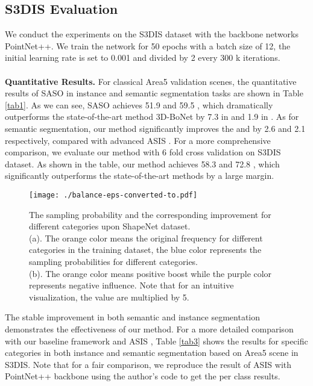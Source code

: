 \documentclass{cta-author}
\begin{document}
\subsection{S3DIS Evaluation}
We conduct the experiments on the S3DIS dataset with the backbone networks PointNet++. We train the network for 50 epochs with a batch size of 12, the initial learning rate is set to 0.001 and divided by 2 every 300 k iterations.\\ \hspace*{\fill} \\
\textbf{Quantitative Results.} For classical Area5 validation scenes, the quantitative results of SASO in instance and semantic segmentation tasks are shown in Table \ref{tab1}. As we can see, SASO achieves 51.9  and 59.5 , which dramatically outperforms the state-of-the-art method 3D-BoNet \cite{yang2019learning} by 7.3 in  and 1.9 in . As for semantic segmentation, our method significantly improves the  and  by 2.6 and 2.1 respectively, compared with advanced ASIS \cite{wang2019associatively}.
For a more comprehensive comparison, we evaluate our method with 6 fold cross validation on S3DIS dataset. As shown in the table,
our method achieves 58.3  and 72.8 , which significantly outperforms the state-of-the-art methods by a large margin.
\begin{figure}[t]
  \begin{center}
   \texttt{[image: ./balance-eps-converted-to.pdf]}
  \end{center}
  \caption{The sampling probability and the corresponding improvement for different categories upon ShapeNet dataset.\\
  (a). The orange color means the original frequency for different categories in the training dataset, the blue color represents the sampling probabilities for different categories.\\
  (b). The orange color means positive boost while the purple color represents negative influence. Note that for an intuitive visualization, the value are multiplied by 5. }
  \label{fig5}
  \end{figure}
The stable improvement in both semantic and instance segmentation demonstrates the effectiveness of our method.
For a more detailed comparison with our baseline framework and ASIS \cite{wang2019associatively}, Table \ref{tab3} shows the results for specific categories in both instance and semantic segmentation based on Area5 scene in S3DIS. Note that for a fair comparison, we reproduce the result of ASIS \cite{wang2019associatively} with PointNet++ backbone using the author's code to get the per class results.\\ \hspace*{\fill} \\
\end{document}
